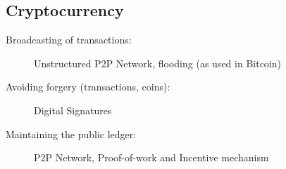 \subsection{Cryptocurrency}
\begin{description}
	\item[Broadcasting of transactions:] Unstructured P2P Network, flooding (as used in Bitcoin)
	\item[Avoiding forgery (transactions, coins):] Digital Signatures
	\item[Maintaining the public ledger:] P2P Network, Proof-of-work and Incentive mechanism
\end{description}